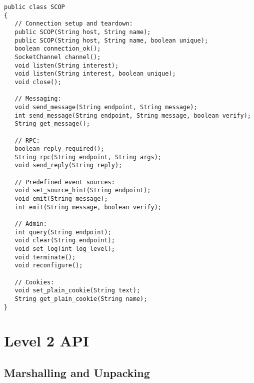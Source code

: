 \documentclass[12pt,a4paper,twoside]{article}
\renewcommand{\_}{\texttt{\symbol{95}}}
\begin{document}
\begin{verbatim}
public class SCOP
{
   // Connection setup and teardown:
   public SCOP(String host, String name);
   public SCOP(String host, String name, boolean unique);
   boolean connection_ok();
   SocketChannel channel();
   void listen(String interest);
   void listen(String interest, boolean unique);
   void close();   

   // Messaging:
   void send_message(String endpoint, String message);
   int send_message(String endpoint, String message, boolean verify);
   String get_message();
   
   // RPC:
   boolean reply_required();
   String rpc(String endpoint, String args);
   void send_reply(String reply);

   // Predefined event sources:
   void set_source_hint(String endpoint); 
   void emit(String message);
   int emit(String message, boolean verify);

   // Admin:
   int query(String endpoint);
   void clear(String endpoint);
   void set_log(int log_level);
   void terminate();
   void reconfigure();

   // Cookies:   
   void set_plain_cookie(String text);
   String get_plain_cookie(String name);
}
\end{verbatim}

\section{Level 2 API}

\subsection{Marshalling and Unpacking}
\end{document}
